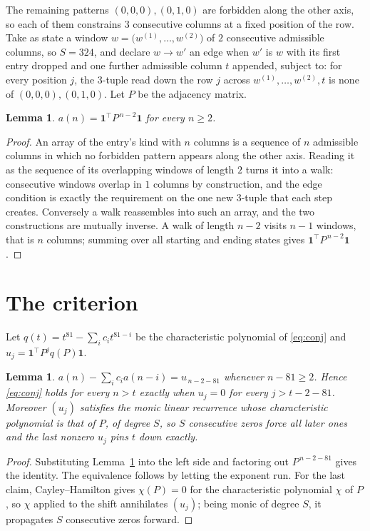 \documentclass[11pt,a4paper]{article}
\theoremstyle{plain}
\newtheorem{lemma}[theorem]{Lemma}
\theoremstyle{definition}
\begin{document}
The remaining patterns $(0,0,0), (0,1,0)$ are forbidden along the other axis, so each of them
constrains $3$ consecutive columns at a fixed position of the row. Take as state a
window $w=\bigl(w^{(1)},\dots,w^{(2)}\bigr)$ of $2$ consecutive admissible
columns, so $S=324$, and declare $w\to w'$ an edge when $w'$ is $w$ with its first entry
dropped and one further admissible column $t$ appended, subject to: for every position
$j$, the $3$-tuple read down the row $j$ across $w^{(1)},\dots,w^{(2)},t$
is none of $(0,0,0), (0,1,0)$. Let $P$ be the adjacency matrix.

\begin{lemma}\label{lem:walk}
$a(n)=\mathbf{1}^{\!\top}P^{\,n-2}\mathbf{1}$ for every $n\ge2$.
\end{lemma}

\begin{proof}
An array of the entry's kind with $n$ columns is a sequence of $n$ admissible columns in
which no forbidden pattern appears along the other axis. Reading it as the sequence of its
overlapping windows of length $2$ turns it into a walk: consecutive windows overlap in
$1$ columns by construction, and the edge condition is exactly the requirement on the one
new $3$-tuple that each step creates. Conversely a walk reassembles into such an array,
and the two constructions are mutually inverse. A walk of length $n-2$ visits $n-1$
windows, that is $n$ columns; summing over all starting and ending states gives
$\mathbf{1}^{\!\top}P^{\,n-2}\mathbf{1}$.
\end{proof}

\section{The criterion}

Let $q(t)=t^{81}-\sum_i c_i t^{81-i}$ be the characteristic polynomial of
\eqref{eq:conj} and $u_j=\mathbf{1}^{\!\top}P^{j}q(P)\mathbf{1}$.

\begin{lemma}\label{lem:crit}
$a(n)-\sum_i c_i a(n-i)=u_{\,n-2-81}$ whenever $n-81\ge2$. Hence
\eqref{eq:conj} holds for every $n>t$ exactly when $u_j=0$ for every
$j>t-2-81$. Moreover $(u_j)$ satisfies the monic linear recurrence whose
characteristic polynomial is that of $P$, of degree $S$, so $S$ consecutive zeros force all
later ones and the last nonzero $u_j$ pins $t$ down exactly.
\end{lemma}

\begin{proof}
Substituting Lemma~\ref{lem:walk} into the left side and factoring out
$P^{\,n-2-81}$ gives the identity. The equivalence follows by letting the exponent
run. For the last claim, Cayley--Hamilton gives $\chi(P)=0$ for the characteristic
polynomial $\chi$ of $P$, so $\chi$ applied to the shift annihilates $(u_j)$; being monic of
degree $S$, it propagates $S$ consecutive zeros forward.
\end{proof}
\end{document}
